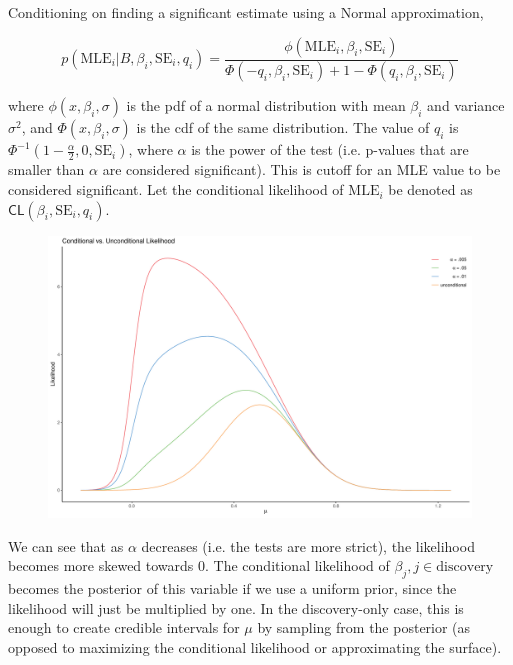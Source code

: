 \documentclass[AMA,STIX1COL]{WileyNJD-v2}\usepackage[]{graphicx}\usepackage[]{color}
\newenvironment{knitrout}{}{} %
\begin{document}
Conditioning on finding a significant estimate using a Normal approximation, 

\begin{equation}\label{eq5}
p(\text{MLE}_i | B,\beta_i,\text{SE}_i,q_i) = \frac{\phi(\text{MLE}_i, \beta_i, \text{SE}_i)}{\Phi(-q_i, \beta_i, \text{SE}_i)+1-\Phi(q_i, \beta_i, \text{SE}_i)}
\end{equation}

where $\phi(x, \beta_i, \sigma)$ is the pdf of a normal distribution with mean $\beta_i$ and variance $\sigma^2$, and $\Phi(x, \beta_i, \sigma)$ is the cdf of the same distribution. The value of $q_i$ is $\Phi^{-1}(1-\frac{\alpha}{2}, 0 ,\text{SE}_i)$, where $\alpha$ is the power of the test (i.e. p-values that are smaller than $\alpha$ are considered significant). This is cutoff for an MLE value to be considered significant. Let the conditional likelihood of $\text{MLE}_i$  be denoted as $\textsf{CL}(\beta_i,\text{SE}_i, q_i)$.




\begin{figure}
\begin{knitrout}
\color{fgcolor}

{\centering \includegraphics[width=6in]{figure/unnamed-chunk-3-1} 

}



\end{knitrout}
\end{figure}
We can see that as $\alpha$ decreases (i.e. the tests are more strict), the likelihood becomes more skewed towards 0. The conditional likelihood of $\beta_{ j}, j\in \text{discovery}$ becomes the posterior of this variable if we use a uniform prior, since the likelihood will just be multiplied by one. In the discovery-only case, this is enough to create credible intervals for $\mu$ by sampling from the posterior (as opposed to maximizing the conditional likelihood or approximating the surface).
\end{document}
